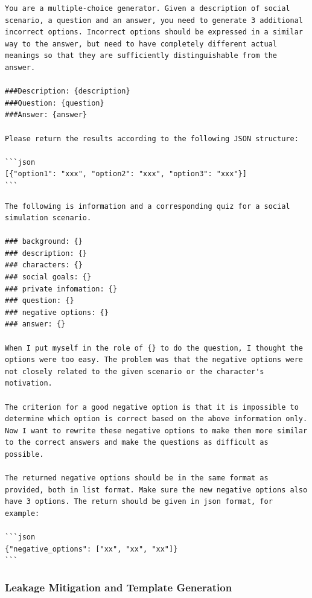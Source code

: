 \begin{tcolorbox}[width=\linewidth]
\begin{lstlisting}[caption=Negative Option Generation]
You are a multiple-choice generator. Given a description of social scenario, a question and an answer, you need to generate 3 additional incorrect options. Incorrect options should be expressed in a similar way to the answer, but need to have completely different actual meanings so that they are sufficiently distinguishable from the answer.

###Description: {description}
###Question: {question}
###Answer: {answer}

Please return the results according to the following JSON structure:

```json
[{"option1": "xxx", "option2": "xxx", "option3": "xxx"}]
```
\end{lstlisting}
\end{tcolorbox}

\begin{tcolorbox}[width=\linewidth]
\begin{lstlisting}[caption=Negative Options Rephrasing]
The following is information and a corresponding quiz for a social simulation scenario.

### background: {}
### description: {}
### characters: {}
### social goals: {}
### private infomation: {}
### question: {}
### negative options: {}
### answer: {}

When I put myself in the role of {} to do the question, I thought the options were too easy. The problem was that the negative options were not closely related to the given scenario or the character's motivation. 

The criterion for a good negative option is that it is impossible to determine which option is correct based on the above information only. Now I want to rewrite these negative options to make them more similar to the correct answers and make the questions as difficult as possible.

The returned negative options should be in the same format as provided, both in list format. Make sure the new negative options also have 3 options. The return should be given in json format, for example:

```json
{"negative_options": ["xx", "xx", "xx"]}
```
\end{lstlisting}
\end{tcolorbox}

\subsubsection{Leakage Mitigation and Template Generation}

